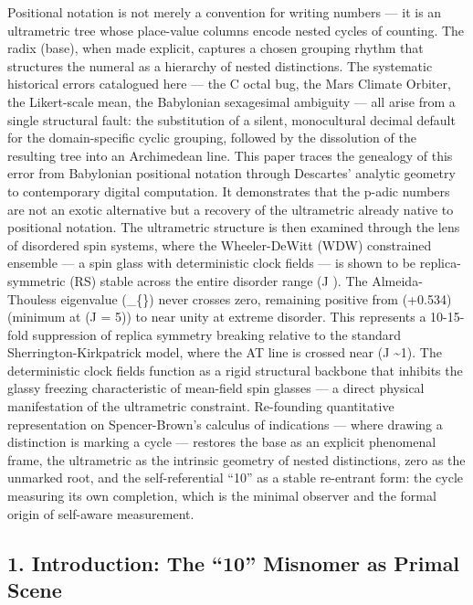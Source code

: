 \documentclass[
]{article}
\begin{document}
Positional notation is not merely a convention for writing numbers ---
it is an ultrametric tree whose place-value columns encode nested cycles
of counting. The radix (base), when made explicit, captures a chosen
grouping rhythm that structures the numeral as a hierarchy of nested
distinctions. The systematic historical errors catalogued here --- the C
octal bug, the Mars Climate Orbiter, the Likert-scale mean, the
Babylonian sexagesimal ambiguity --- all arise from a single structural
fault: the substitution of a silent, monocultural decimal default for
the domain-specific cyclic grouping, followed by the dissolution of the
resulting tree into an Archimedean line. This paper traces the genealogy
of this error from Babylonian positional notation through Descartes'
analytic geometry to contemporary digital computation. It demonstrates
that the p-adic numbers are not an exotic alternative but a recovery of
the ultrametric already native to positional notation. The ultrametric
structure is then examined through the lens of disordered spin systems,
where the Wheeler-DeWitt (WDW) constrained ensemble --- a spin glass
with deterministic clock fields --- is shown to be replica-symmetric
(RS) stable across the entire disorder range (\beta J \in [1, 30]). The
Almeida-Thouless eigenvalue (\lambda\_\{\}) never crosses zero,
remaining positive from (+0.534) (minimum at (\beta J = 5)) to near
unity at extreme disorder. This represents a 10-15-fold suppression of
replica symmetry breaking relative to the standard
Sherrington-Kirkpatrick model, where the AT line is crossed near
(\beta J \sim 1). The deterministic clock fields function as a rigid
structural backbone that inhibits the glassy freezing characteristic of
mean-field spin glasses --- a direct physical manifestation of the
ultrametric constraint. Re-founding quantitative representation on
Spencer-Brown's calculus of indications --- where drawing a distinction
is marking a cycle --- restores the base as an explicit phenomenal
frame, the ultrametric as the intrinsic geometry of nested distinctions,
zero as the unmarked root, and the self-referential ``10'' as a stable
re-entrant form: the cycle measuring its own completion, which is the
minimal observer and the formal origin of self-aware measurement.

\subsection{1. Introduction: The ``10'' Misnomer as Primal
Scene}\label{introduction-the-10-misnomer-as-primal-scene}
\end{document}
